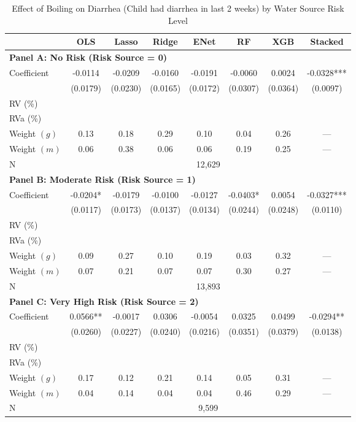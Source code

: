 \begin{table}[htbp]
\centering
\caption{Effect of Boiling on Diarrhea (Child had diarrhea in last 2 weeks) by Water Source Risk Level}
\label{tab:diarrhea_subgroups}
\begin{tabular}{lccccccc}
\toprule
 & OLS & Lasso & Ridge & ENet & RF & XGB & Stacked \\
\midrule
\multicolumn{8}{l}{\textbf{Panel A: No Risk (Risk Source = 0)}} \\
\midrule
Coefficient & -0.0114 & -0.0209 & -0.0160 & -0.0191 & -0.0060 & 0.0024 & -0.0328*** \\
 & (0.0179) & (0.0230) & (0.0165) & (0.0172) & (0.0307) & (0.0364) & (0.0097) \\
RV (\%) \\
RVa (\%) \\
Weight $(g)$ & 0.13 & 0.18 & 0.29 & 0.10 & 0.04 & 0.26 & — \\
Weight $(m)$ & 0.06 & 0.38 & 0.06 & 0.06 & 0.19 & 0.25 & — \\
N & \multicolumn{7}{c}{12,629} \\

\multicolumn{8}{l}{\textbf{Panel B: Moderate Risk (Risk Source = 1)}} \\
\midrule
Coefficient & -0.0204* & -0.0179 & -0.0100 & -0.0127 & -0.0403* & 0.0054 & -0.0327*** \\
 & (0.0117) & (0.0173) & (0.0137) & (0.0134) & (0.0244) & (0.0248) & (0.0110) \\
RV (\%) \\
RVa (\%) \\
Weight $(g)$ & 0.09 & 0.27 & 0.10 & 0.19 & 0.03 & 0.32 & — \\
Weight $(m)$ & 0.07 & 0.21 & 0.07 & 0.07 & 0.30 & 0.27 & — \\
N & \multicolumn{7}{c}{13,893} \\

\multicolumn{8}{l}{\textbf{Panel C: Very High Risk (Risk Source = 2)}} \\
\midrule
Coefficient & 0.0566** & -0.0017 & 0.0306 & -0.0054 & 0.0325 & 0.0499 & -0.0294** \\
 & (0.0260) & (0.0227) & (0.0240) & (0.0216) & (0.0351) & (0.0379) & (0.0138) \\
RV (\%) \\
RVa (\%) \\
Weight $(g)$ & 0.17 & 0.12 & 0.21 & 0.14 & 0.05 & 0.31 & — \\
Weight $(m)$ & 0.04 & 0.14 & 0.04 & 0.04 & 0.46 & 0.29 & — \\
N & \multicolumn{7}{c}{9,599} \\


\end{tabular}
\end{table}
